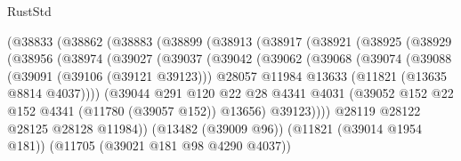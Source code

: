 \begin{lexlean}{RustStd}
\begin{coremodule}
                      (@38833
                        (@38862
                          (@38883
                            (@38899
                              (@38913
                                (@38917
                                  (@38921
                                    (@38925
                                      (@38929
                                        (@38956
                                          (@38974
                                            (@39027
                                              (@39037
                                                (@39042
                                                  (@39062
                                                    (@39068
                                                      (@39074
                                                        (@39088
                                                          (@39091 (@39106 (@39121 @39123)))
                                                          @28057
                                                          @11984
                                                          @13633
                                                          (@11821 (@13635 @8814 @4037))))
                                                      (@39044
                                                        @291
                                                        @120
                                                        @22
                                                        @28
                                                        @4341
                                                        @4031
                                                        (@39052
                                                          @152
                                                          @22
                                                          @152
                                                          @4341
                                                          (@11780 (@39057 @152))
                                                          @13656)
                                                        @39123))))
                                                @28119
                                                @28122
                                                @28125
                                                @28128
                                                @11984))
                                            (@13482 (@39009 @96))
                                            (@11821 (@39014 @1954 @181))
                                            (@11705 (@39021 @181 @98 @4290 @4037))

\end{coremodule}
\end{lexlean}
